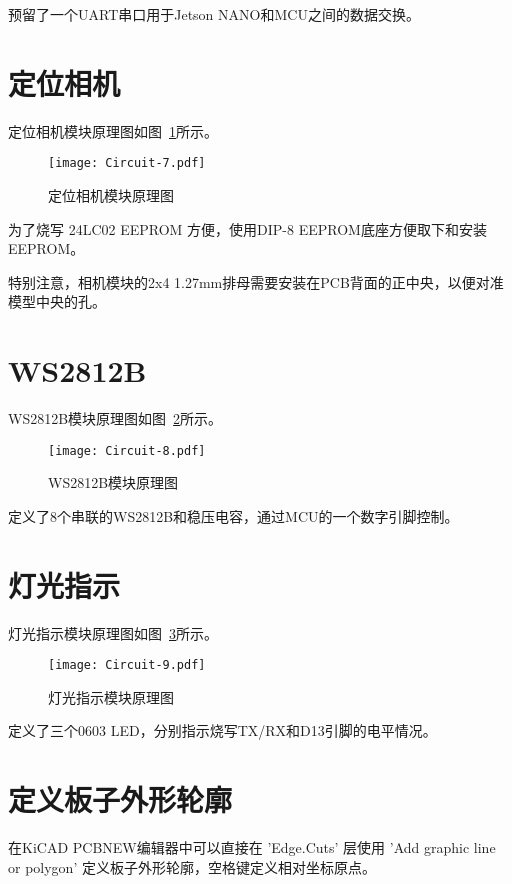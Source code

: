 预留了一个UART串口用于Jetson NANO和MCU之间的数据交换。

\section{定位相机}

定位相机模块原理图如图~\ref{fig:Circuit-7}所示。

\begin{figure}[htbp]
    \centering
    \texttt{[image: Circuit-7.pdf]}
    \caption{定位相机模块原理图}
    \label{fig:Circuit-7}
\end{figure}

为了烧写 24LC02 EEPROM 方便，使用DIP-8 EEPROM底座方便取下和安装EEPROM。

特别注意，相机模块的2x4 1.27mm排母需要安装在PCB背面的正中央，以便对准模型中央的孔。

\section{WS2812B}

WS2812B模块原理图如图~\ref{fig:Circuit-8}所示。

\begin{figure}[htbp]
    \centering
    \texttt{[image: Circuit-8.pdf]}
    \caption{WS2812B模块原理图}
    \label{fig:Circuit-8}
\end{figure}

定义了8个串联的WS2812B和稳压电容，通过MCU的一个数字引脚控制。

\section{灯光指示}

灯光指示模块原理图如图~\ref{fig:Circuit-9}所示。

\begin{figure}[htbp]
    \centering
    \texttt{[image: Circuit-9.pdf]}
    \caption{灯光指示模块原理图}
    \label{fig:Circuit-9}
\end{figure}

定义了三个0603 LED，分别指示烧写TX/RX和D13引脚的电平情况。

\section{定义板子外形轮廓}

在KiCAD PCBNEW编辑器中可以直接在 'Edge.Cuts' 层使用 'Add graphic line or polygon' 定义板子外形轮廓，空格键定义相对坐标原点。

